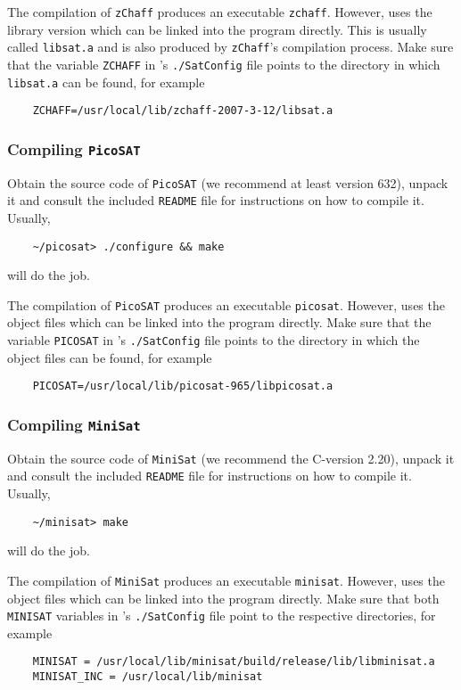 The compilation of \texttt{zChaff} produces an executable \texttt{zchaff}. However, \pgsolver uses the
library version which can be linked into the program directly. This is usually called \texttt{libsat.a}
and is also produced by \texttt{zChaff}'s compilation process. Make sure that the variable
\verb#ZCHAFF# in \pgsolver's \texttt{./SatConfig} file points to the
directory in which \texttt{libsat.a} can be found, for example
\begin{verbatim}
    ZCHAFF=/usr/local/lib/zchaff-2007-3-12/libsat.a
\end{verbatim}


\subsubsection{Compiling \texttt{PicoSAT}}

Obtain the source code of \texttt{PicoSAT} (we recommend at least version 632), unpack it and
consult the included \texttt{README} file for instructions on how to compile it. Usually,
\begin{verbatim}
    ~/picosat> ./configure && make
\end{verbatim}
will do the job.

The compilation of \texttt{PicoSAT} produces an executable \texttt{picosat}. However, \pgsolver uses the
object files which can be linked into the program directly. Make sure that the variable
\verb#PICOSAT# in \pgsolver's \texttt{./SatConfig} file points to the directory
in which the object files can be found, for example
\begin{verbatim}
    PICOSAT=/usr/local/lib/picosat-965/libpicosat.a
\end{verbatim}


\subsubsection{Compiling \texttt{MiniSat}}

Obtain the source code of \texttt{MiniSat} (we recommend the C-version 2.20),
unpack it and consult the included \texttt{README} file for instructions on how to compile it. Usually,
\begin{verbatim}
    ~/minisat> make
\end{verbatim}
will do the job.

The compilation of \texttt{MiniSat} produces an executable \texttt{minisat}. However, \pgsolver uses the
object files which can be linked into the program directly. Make sure that both
\verb#MINISAT# variables in \pgsolver's \texttt{./SatConfig} file point to the
respective directories, for example
\begin{verbatim}
    MINISAT = /usr/local/lib/minisat/build/release/lib/libminisat.a
    MINISAT_INC = /usr/local/lib/minisat
\end{verbatim}



